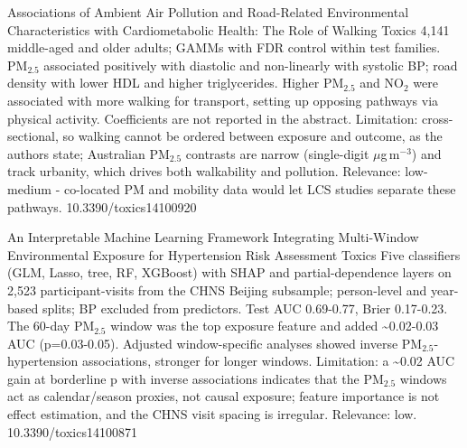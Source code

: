 \documentclass[10pt]{article}
\begin{document}
\par{}\baselineskip{}\baselineskip
{}

{Associations of Ambient Air Pollution and Road-Related Environmental Characteristics with Cardiometabolic Health: The Role of Walking}
{Toxics}
{4,141 middle-aged and older adults; GAMMs with FDR control within test families. PM$_{2.5}$ associated positively with diastolic and non-linearly with systolic BP; road density with lower HDL and higher triglycerides. Higher PM$_{2.5}$ and NO$_2$ were associated with more walking for transport, setting up opposing pathways via physical activity. Coefficients are not reported in the abstract. Limitation: cross-sectional, so walking cannot be ordered between exposure and outcome, as the authors state; Australian PM$_{2.5}$ contrasts are narrow (single-digit $\mu$g\,m$^{-3}$) and track urbanity, which drives both walkability and pollution. Relevance: low-medium - co-located PM and mobility data would let LCS studies separate these pathways.}
{10.3390/toxics14100920}

{An Interpretable Machine Learning Framework Integrating Multi-Window Environmental Exposure for Hypertension Risk Assessment}
{Toxics}
{Five classifiers (GLM, Lasso, tree, RF, XGBoost) with SHAP and partial-dependence layers on 2,523 participant-visits from the CHNS Beijing subsample; person-level and year-based splits; BP excluded from predictors. Test AUC 0.69-0.77, Brier 0.17-0.23. The 60-day PM$_{2.5}$ window was the top exposure feature and added \textasciitilde{}0.02-0.03 AUC (p=0.03-0.05). Adjusted window-specific analyses showed inverse PM$_{2.5}$-hypertension associations, stronger for longer windows. Limitation: a \textasciitilde{}0.02 AUC gain at borderline p with inverse associations indicates that the PM$_{2.5}$ windows act as calendar/season proxies, not causal exposure; feature importance is not effect estimation, and the CHNS visit spacing is irregular. Relevance: low.}
{10.3390/toxics14100871}

\par{}\baselineskip{}\baselineskip
{}
\end{document}
